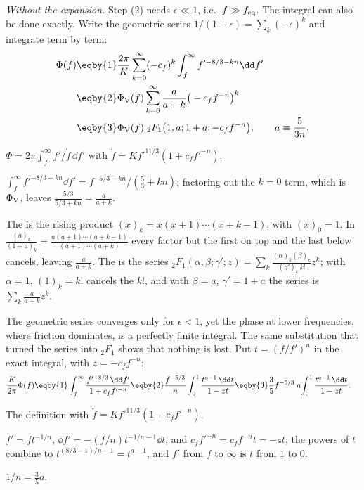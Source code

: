 \emph{Without the expansion.} Step (2) needs $\epsilon\ll1$, i.e.\ $f\gg f_{\rm eq}$. The integral can also be done exactly. Write the geometric series $1/(1+\epsilon)=\sum_k(-\epsilon)^k$ and integrate term by term:
\begin{align}
  \Phi(f)
  &\eqby{1}\frac{2\pi}{K}\sum_{k=0}^\infty(-c_f)^k\int_f^\infty f'^{-8/3-kn}\dd f'\nonumber\\
  &\eqby{2}\Phi_{\rm V}(f)\sum_{k=0}^\infty\frac{a}{a+k}\big(-c_ff^{-n}\big)^k\nonumber\\
  &\eqby{3}\Phi_{\rm V}(f)\;{}_2F_1\big(1,a;1+a;-c_ff^{-n}\big),\qquad a\equiv\frac5{3n}.\label{T2a:eq:hyp}
\end{align}
\begin{explain}
  \item $\Phi=2\pi\int_f^\infty f'/\dot f\,\dd f'$ with $\dot f=Kf'^{11/3}(1+c_ff'^{-n})$.
  \item $\int_f^\infty f'^{-8/3-kn}\dd f'=f^{-5/3-kn}/(\tfrac53+kn)$; factoring out the $k=0$ term, which is $\Phi_{\rm V}$, leaves $\tfrac{5/3}{5/3+kn}=\tfrac{a}{a+k}$.
  \item The  is the rising product $(x)_k=x(x+1)\cdots(x+k-1)$, with $(x)_0=1$. In $\frac{(a)_k}{(1+a)_k}=\frac{a(a+1)\cdots(a+k-1)}{(a+1)\cdots(a+k)}$ every factor but the first on top and the last below cancels, leaving $\frac{a}{a+k}$. The  is the series ${}_2F_1(\alpha,\beta;\gamma';z)=\sum_k\frac{(\alpha)_k(\beta)_k}{(\gamma')_k\,k!}z^k$; with $\alpha=1$, $(1)_k=k!$ cancels the $k!$, and with $\beta=a$, $\gamma'=1+a$ the series is $\sum_k\frac{a}{a+k}z^k$.
\end{explain}
The geometric series converges only for $\epsilon<1$, yet the phase at lower frequencies, where friction dominates, is a perfectly finite integral. The same substitution that turned the series into ${}_2F_1$ shows that nothing is lost. Put $t=(f/f')^n$ in the exact integral, with $z=-c_ff^{-n}$:
\begin{align*}
  \frac{K}{2\pi}\Phi(f)
  &\eqby{1}\int_f^\infty\frac{f'^{-8/3}\,\dd f'}{1+c_ff'^{-n}}
  \eqby{2}\frac{f^{-5/3}}{n}\int_0^1\frac{t^{a-1}\,\dd t}{1-zt}
  \eqby{3}\frac35f^{-5/3}\;a\!\int_0^1\frac{t^{a-1}\,\dd t}{1-zt}.
\end{align*}
\begin{explain}
  \item The definition with $\dot f=Kf'^{11/3}(1+c_ff'^{-n})$.
  \item $f'=ft^{-1/n}$, $\dd f'=-(f/n)t^{-1/n-1}\dd t$, and $c_ff'^{-n}=c_ff^{-n}t=-zt$; the powers of $t$ combine to $t^{(8/3-1)/n-1}=t^{a-1}$, and $f'$ from $f$ to $\infty$ is $t$ from $1$ to $0$.
  \item $1/n=\tfrac35a$.
\end{explain}
